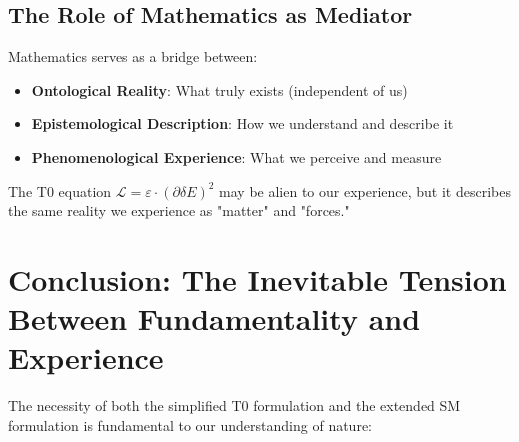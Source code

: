 \documentclass[12pt,a4paper]{article}
\begin{document}
	\subsection{The Role of Mathematics as Mediator}
	
	\begin{tcolorbox}[colback=purple!5!white,colframe=purple!75!black,title=Mathematics as Universal Language]
		Mathematics serves as a bridge between:
		\begin{itemize}
			\item \textbf{Ontological Reality}: What truly exists (independent of us)
			\item \textbf{Epistemological Description}: How we understand and describe it
			\item \textbf{Phenomenological Experience}: What we perceive and measure
		\end{itemize}
		
		The T0 equation $\mathcal{L} = \varepsilon \cdot (\partial\delta E)^2$ may be alien to our experience, but it describes the same reality we experience as "matter" and "forces."
	\end{tcolorbox}
	
	\section{Conclusion: The Inevitable Tension Between Fundamentality and Experience}
	
	The necessity of both the simplified T0 formulation and the extended SM formulation is fundamental to our understanding of nature:
	
\end{document}
